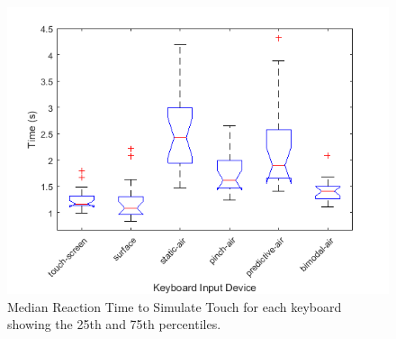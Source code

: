 \begin{figure}[t]
	\centering
	\includegraphics{Figures/fig_reaction_touch_boxplot}
	\caption[Reaction Time to Simulate Touch Boxplot]{Median Reaction Time to Simulate Touch for each keyboard showing the 25th and 75th percentiles.}
	\label{fig_reaction_touch_boxplot}
\end{figure}

